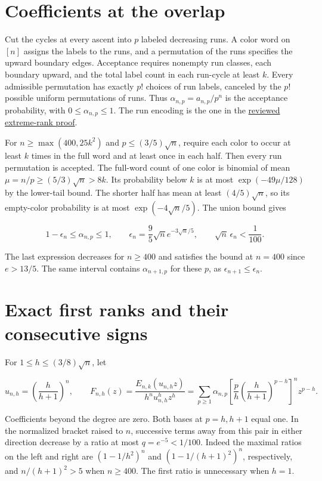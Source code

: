 \documentclass[11pt]{article}
\begin{document}
\section{Coefficients at the overlap}

Cut the cycles at every ascent into $p$ labeled decreasing runs. A color word on $[n]$ assigns the labels to the runs, and a permutation of the runs specifies the upward boundary edges. Acceptance requires nonempty run classes, each boundary upward, and the total label count in each run-cycle at least $k$. Every admissible permutation has exactly $p!$ choices of run labels, canceled by the $p!$ possible uniform permutations of runs. Thus $\alpha_{n,p}=a_{n,p}/p^n$ is the acceptance probability, with $0\le\alpha_{n,p}\le1$. The run encoding is the one in the \href{https://github.com/ProgramComputer/open-math-research/pull/7}{reviewed extreme-rank proof}.

For $n\ge\max(400,25k^2)$ and $p\le(3/5)\sqrt n$, require each color to occur at least $k$ times in the full word and at least once in each half. Then every run permutation is accepted. The full-word count of one color is binomial of mean $\mu=n/p\ge(5/3)\sqrt n>8k$. Its probability below $k$ is at most $\exp(-49\mu/128)$ by the lower-tail bound. The shorter half has mean at least $(4/5)\sqrt n$, so its empty-color probability is at most $\exp(-4\sqrt n/5)$. The union bound gives

\[
1-\epsilon_n\le\alpha_{n,p}\le1,\qquad
\epsilon_n=\frac95\sqrt n e^{-3\sqrt n/5},\qquad
\sqrt n\,\epsilon_n<\frac1{100}.
\tag{2}
\]

The last expression decreases for $n\ge400$ and satisfies the bound at $n=400$ since $e>13/5$. The same interval contains $\alpha_{n+1,p}$ for these $p$, as $\epsilon_{n+1}\le\epsilon_n$.

\section{Exact first ranks and their consecutive signs}

For $1\le h\le(3/8)\sqrt n$, let

\[
u_{n,h}=\left(\frac h{h+1}\right)^n,\qquad
F_{n,h}(z)=\frac{E_{n,k}(u_{n,h}z)}{h^n u_{n,h}^h z^h}
=\sum_{p\ge1}\alpha_{n,p}
\left[\frac ph\left(\frac h{h+1}\right)^{p-h}\right]^n z^{p-h}.
\]

Coefficients beyond the degree are zero. Both bases at $p=h,h+1$ equal one. In the normalized bracket raised to $n$, successive terms away from this pair in either direction decrease by a ratio at most $q=e^{-5}<1/100$. Indeed the maximal ratios on the left and right are $(1-1/h^2)^n$ and $(1-1/(h+1)^2)^n$, respectively, and $n/(h+1)^2>5$ when $n\ge400$. The first ratio is unnecessary when $h=1$.
\end{document}

